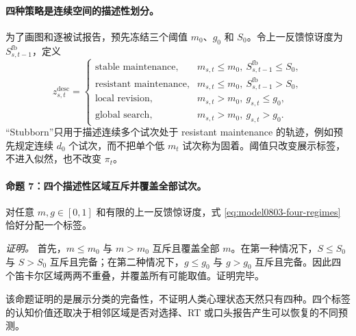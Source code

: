 \paragraph{四种策略是连续空间的描述性划分。}
为了画图和逐被试报告，预先冻结三个阈值 $m_0$、$g_0$ 和 $S_0$。令上一反馈惊讶度为 $S^{\mathrm{fb}}_{s,t-1}$，定义
\begin{equation}
    z_{s,t}^{\mathrm{desc}}
    =
    \begin{cases}
    \text{stable maintenance},
      &m_{s,t}\leq m_0,
       \ S^{\mathrm{fb}}_{s,t-1}\leq S_0,\\
    \text{resistant maintenance},
      &m_{s,t}\leq m_0,
       \ S^{\mathrm{fb}}_{s,t-1}>S_0,\\
    \text{local revision},
      &m_{s,t}>m_0,
       \ g_{s,t}\leq g_0,\\
    \text{global search},
      &m_{s,t}>m_0,
       \ g_{s,t}>g_0.
    \end{cases}
    \label{eq:model0803-four-regimes}
\end{equation}
“Stubborn”只用于描述连续多个试次处于 resistant maintenance 的轨迹，例如预先规定连续 $d_0$ 个试次，而不把单个低 $m_t$ 试次称为固着。阈值只改变展示标签，不进入似然，也不改变 $\pi_t$。

\paragraph{命题 7：四个描述性区域互斥并覆盖全部试次。}
对任意 $m,g\in[0,1]$ 和有限的上一反馈惊讶度，式 \ref{eq:model0803-four-regimes} 恰好分配一个标签。

\textit{证明。}
首先，$m\leq m_0$ 与 $m>m_0$ 互斥且覆盖全部 $m$。在第一种情况下，$S\leq S_0$ 与 $S>S_0$ 互斥且完备；在第二种情况下，$g\leq g_0$ 与 $g>g_0$ 互斥且完备。因此四个笛卡尔区域两两不重叠，并覆盖所有可能取值。证明完毕。

该命题证明的是展示分类的完备性，不证明人类心理状态天然只有四种。四个标签的认知价值还取决于相邻区域是否对选择、RT 或口头报告产生可以恢复的不同预测。

